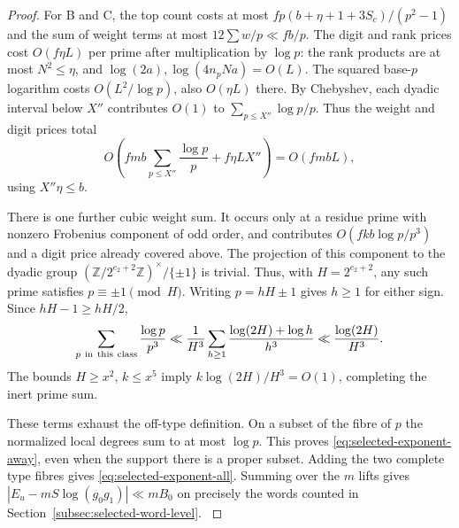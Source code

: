 \begin{proof}
For B and C, the top count costs at most
\(fp(b+\eta+1+3S_c)/(p^2-1)\) and the sum of weight
terms at most \(12\sum w/p\ll fb/p\).
The digit and rank prices cost \(O(f\eta L)\) per prime
after multiplication by \(\log p\): the rank products
are at most \(N^2\le\eta\), and \(\log(2a),\log(4n_pNa)=O(L)\).
The squared base-\(p\) logarithm costs \(O(L^2/\log p)\),
also \(O(\eta L)\) there.
By Chebyshev, each dyadic interval below \(X''\) contributes
\(O(1)\) to \(\sum_{p\le X''}\log p/p\). Thus the weight
and digit prices total
\[
 O\left(fmb\sum_{p\le X''}\frac{\log p}{p}
                       +f\eta L X''\right)=O(fmbL),
\]
using \(X''\eta\le b\).

There is one further cubic weight sum. It occurs only at a
residue prime with nonzero Frobenius component of odd order, and
contributes \(O(fkb\log p/p^3)\) and a digit price already covered
above. The projection of this component to the dyadic group
\((\mathbb Z/2^{e_2+2}\mathbb Z)^\times/\{\pm1\}\) is trivial.
Thus, with \(H=2^{e_2+2}\), any such prime satisfies
\(p\equiv\pm1\pmod H\). Writing \(p=hH\pm1\) gives \(h\ge1\) for
either sign. Since \(hH-1\ge hH/2\),
\[
 \sum_{p\ {\rm in\ this\ class}}\frac{\log p}{p^3}
 \ll \frac1{H^3}\sum_{h\ge1}\frac{\log(2H)+\log h}{h^3}
 \ll\frac{\log(2H)}{H^3}.
\]
The bounds \(H\ge x^2\), \(k\le x^5\) imply
\(k\log(2H)/H^3=O(1)\), completing the inert prime sum.

These terms exhaust the off-type definition. On a subset of the
fibre of \(p\) the normalized local degrees sum to at most \(\log p\).
This proves \eqref{eq:selected-exponent-away}, even when the
support there is a proper subset. Adding the two complete type
fibres gives \eqref{eq:selected-exponent-all}. Summing over the
\(m\) lifts gives \(|E_u-mS\log(g_0g_1)|\ll mB_0\) on precisely
the words counted in Section~\ref{subsec:selected-word-level}.
\label{cor:selected-exponent-2}
\end{proof}

